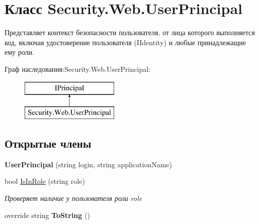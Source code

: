 \hypertarget{class_security_1_1_web_1_1_user_principal}{}\section{Класс Security.\+Web.\+User\+Principal}
\label{class_security_1_1_web_1_1_user_principal}


Представляет контекст безопасности пользователя, от лица которого выполняется код, включая удостоверение пользователя (I\+Identity) и любые принадлежащие ему роли.  


Граф наследования\+:Security.\+Web.\+User\+Principal\+:\begin{figure}[H]
\begin{center}
\leavevmode
\includegraphics[height=2.000000cm]{da/da6/class_security_1_1_web_1_1_user_principal}
\end{center}
\end{figure}
\subsection*{Открытые члены}
\begin{DoxyCompactItemize}
\item 
\mbox{\label{class_security_1_1_web_1_1_user_principal_a98299d23de0f97894651d2f789281270}} 
{\bfseries User\+Principal} (string login, string application\+Name)
\item 
bool \hyperlink{class_security_1_1_web_1_1_user_principal_a3cf055fe8bf4df333a1285f9d1d33f3a}{Is\+In\+Role} (string role)
\begin{DoxyCompactList}\small\item\em Проверяет наличие у пользователя роли role \end{DoxyCompactList}\item 
\mbox{\label{class_security_1_1_web_1_1_user_principal_a085f2aad907d57cce57e75462f38abb1}} 
override string {\bfseries To\+String} ()
\end{DoxyCompactItemize}
